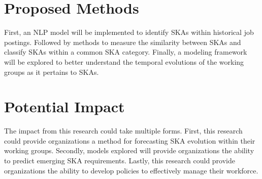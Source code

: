 \documentclass[12pt]{article}
\begin{document}
\section{Proposed Methods}

First, an NLP model will be implemented to identify SKAs within historical job postings. Followed by methods to measure the similarity between SKAs and classify SKAs within a common SKA category. Finally, a modeling framework will be explored to better understand the temporal evolutions of the working groups as it pertains to SKAs.

\section{Potential Impact}

The impact from this research could take multiple forms. First, this research could provide organizations a method for forecasting SKA evolution within their working groups. Secondly, models explored will provide organizations the ability to predict emerging SKA requirements. Lastly, this research could provide organizations the ability to develop policies to effectively manage their workforce.

\newpage



\end{document}
